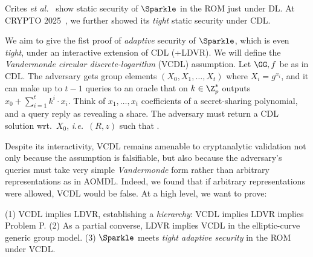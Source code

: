  Crites \emph{et al.}~\cite{C:CriKomMal23} show static security of $\Sparkle$ in the ROM just under  DL.  At CRYPTO 2025~\cite{C:CFOS25}, we further showed its \emph{tight} static security under CDL.  %

We aim to give the fist proof of  \emph{adaptive} security of $\Sparkle$, which is  even \emph{tight}, under an interactive  extension of CDL (+LDVR). 
We will define  the \emph{Vandermonde circular  discrete-logarithm} (VCDL) assumption. Let $\GG,f$ be as in CDL. The adversary gets group elements $(X_0,X_1,\ldots,X_t)$ where $X_i = g^{x_i}$, and it can make up to $t-1$ queries to an oracle that on $k \in \Z^*_p$ outputs $x_0 + \sum_{i=1}^t k^i \cdot x_i$. Think   of $x_1,\ldots,x_t$ coefficients of a  secret-sharing polynomial, and a query reply as revealing a share. The adversary must return a CDL solution wrt.~$X_0$, \emph{i.e.}~$(R,z)$ such that . 


Despite its interactivity, VCDL remains amenable to cryptanalytic validation not only 
because the assumption is falsifiable, but also because the adversary’s queries must take 
very simple \emph{Vandermonde} form rather than arbitrary representations as in AOMDL. 
Indeed, we found that if arbitrary representations were allowed, VCDL would be false.  At a high level, we want to prove: %
\begin{conj}  \label{conj-spar}
(1) VCDL implies LDVR, establishing a  \emph{hierarchy}: VCDL implies LDVR implies Problem P. (2) As a partial converse, LDVR implies  VCDL in the elliptic-curve generic group model. (3) $\Sparkle$ meets \emph{tight  adaptive security} in the ROM under VCDL. %
\end{conj}


